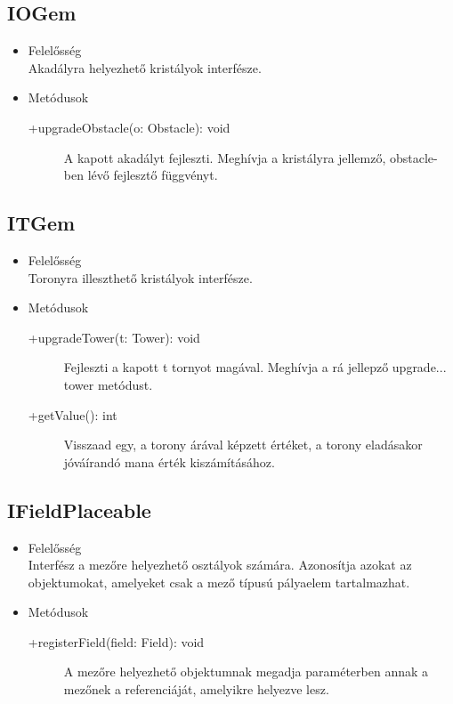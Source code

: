 \subsection{IOGem}
\begin{itemize}
\item Felelősség\\
Akadályra helyezhető kristályok interfésze.

\item Metódusok\\
	\begin{description}
		\item[+upgradeObstacle(o: Obstacle): void] A kapott akadályt fejleszti. Meghívja a kristályra jellemző, obstacle-ben lévő fejlesztő függvényt. 
		
	\end{description}
\end{itemize}
\subsection{ITGem}
\begin{itemize}
\item Felelősség\\
Toronyra illeszthető kristályok interfésze.

\item Metódusok\\
	\begin{description}
		\item[+upgradeTower(t: Tower): void] Fejleszti a kapott t tornyot magával. Meghívja a rá jellepző upgrade...  tower metódust. 
\item[+getValue(): int] Visszaad egy, a torony árával képzett értéket, a torony eladásakor jóváírandó mana érték kiszámításához.

		
	\end{description}
\end{itemize}
\subsection{IFieldPlaceable}
\begin{itemize}
\item Felelősség\\
Interfész a mezőre helyezhető osztályok számára. Azonosítja azokat az objektumokat, amelyeket csak a mező típusú pályaelem tartalmazhat.

\item Metódusok\\
	\begin{description}
		\item[+registerField(field: Field): void] A mezőre helyezhető objektumnak megadja  paraméterben annak a mezőnek a referenciáját, amelyikre helyezve lesz. 


		
	\end{description}
\end{itemize}
